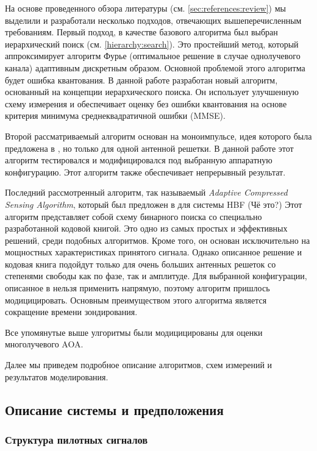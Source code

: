 На основе проведенного обзора литературы (см. \ref{sec:references:review}) мы выделили и разработали
несколько подходов, отвечающих вышеперечисленным требованиям. Первый подход, в качестве базового алгоритма был выбран иерархический поиск (см. \ref{hierarchy:search}).
Это простейший метод, который аппроксимирует алгоритм Фурье (оптимальное решение в случае однолучевого канала) адаптивным дискретным образом.
Основной проблемой этого алгоритма будет ошибка квантования.  В данной работе разработан новый алгоритм, основанный на концепции иерархического поиска. Он использует улучшенную схему измерения и обеспечивает
оценку без ошибки квантования на основе критерия минимума среднеквадратичной ошибки (MMSE).

Второй рассматриваемый алгоритм основан на моноимпульсе, идея которого была предложена в
\cite{Zhu2016, Kim2019}, но только для одной антенной решетки. В данной работе этот алгоритм тестировался и модифицировался под выбранную аппаратную конфигурацию.
Этот алгоритм также обеспечивает непрерывный результат.

Последний рассмотренный алгоритм, так называемый \textit{Adaptive Compressed Sensing Algorithm}, который был предложен в \cite{Alkhateeb2014} для системы HBF (Чё это?)
Этот алгоритм представляет собой схему бинарного поиска со специально разработанной кодовой книгой. Это одно из самых простых и эффективных решений, среди подобных алгоритмов.
Кроме того, он основан исключительно на мощностных характеристиках принятого сигнала.
Однако описанное решение и кодовая книга подойдут только для очень больших антенных решеток
со степенями свободы как по фазе, так и амплитуде. Для выбранной конфигурации, описанное в \cite{Alkhateeb2014} нельзя применить напрямую, поэтому алгоритм пришлось модицицировать.
Основным преимуществом этого алгоритма является сокращение времени зондирования.

Все упомянутые выше улгоритмы были модицицированы для оценки многолучевого AOA.

Далее мы приведем подробное описание алгоритмов, схем измерений и результатов
моделирования.

\subsection{Описание системы и предположения}
\subsubsection{Структура пилотных сигналов}


